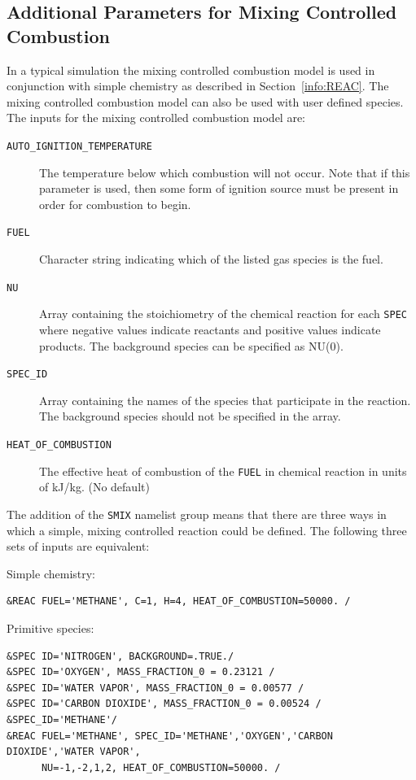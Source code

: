 \documentclass[11pt]{book}
\newcommand{\ct}{\tt\small}
\begin{document}
\subsection{Additional Parameters for Mixing Controlled Combustion}
\label{info:mixing}

In a typical simulation the mixing controlled combustion model is used in conjunction with simple chemistry as described in Section~\ref{info:REAC}.
The mixing controlled combustion model can also be used with user defined species.  The inputs for the mixing controlled combustion model are:

\begin{description}
\item[{\ct AUTO\_IGNITION\_TEMPERATURE}] The temperature below which combustion will not occur.  Note that if this parameter is used,
then some form of ignition source must be present in order for combustion to begin.
\item[{\ct FUEL}] Character string indicating which of the listed gas species is the fuel.
\item[{\ct NU}] Array containing the stoichiometry of the chemical reaction for each {\ct SPEC} where negative values indicate reactants and positive values indicate products.
The background species can be specified as NU(0).
\item[{\ct SPEC\_ID}] Array containing the names of the species that participate in the reaction.  The background species should not be specified in the array.
\item[{\ct HEAT\_OF\_COMBUSTION}] The effective heat of combustion of the {\ct FUEL} in chemical reaction in units of kJ/kg. (No default)
\end{description}

The addition of the {\ct SMIX} namelist group means that there are three ways in which a simple, mixing controlled reaction could be defined.
The following three sets of inputs are equivalent:

Simple chemistry:

\footnotesize
\begin{verbatim}
&REAC FUEL='METHANE', C=1, H=4, HEAT_OF_COMBUSTION=50000. /
\end{verbatim} \normalsize

Primitive species:

\footnotesize
\begin{verbatim}
&SPEC ID='NITROGEN', BACKGROUND=.TRUE./
&SPEC ID='OXYGEN', MASS_FRACTION_0 = 0.23121 /
&SPEC ID='WATER VAPOR', MASS_FRACTION_0 = 0.00577 /
&SPEC ID='CARBON DIOXIDE', MASS_FRACTION_0 = 0.00524 /
&SPEC_ID='METHANE'/
&REAC FUEL='METHANE', SPEC_ID='METHANE','OXYGEN','CARBON DIOXIDE','WATER VAPOR',
      NU=-1,-2,1,2, HEAT_OF_COMBUSTION=50000. /
\end{verbatim} \normalsize
\end{document}
